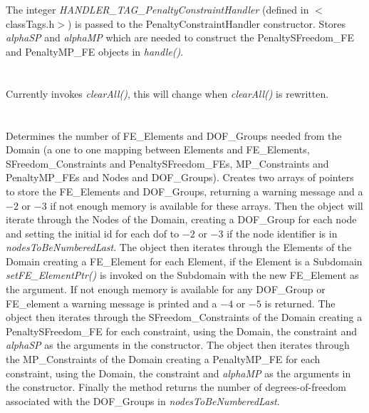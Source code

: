  \\
\\ 
The integer {\em HANDLER\_TAG\_PenaltyConstraintHandler} (defined in
$<$classTags.h$>$) is passed to the PenaltyConstraintHandler
constructor. Stores {\em alphaSP} and {\em alphaMP} which are needed
to construct the PenaltySFreedom\_FE and PenaltyMP\_FE objects in {\em
handle()}. \\

 \\
\\ 
Currently invokes {\em clearAll()}, this will change when {\em
clearAll()} is rewritten. \\

\\
 \\
Determines the number of FE\_Elements and DOF\_Groups needed from the
Domain (a one to one mapping between Elements and FE\_Elements,
SFreedom\_Constraints and PenaltySFreedom\_FEs, MP\_Constraints and PenaltyMP\_FEs and
Nodes and DOF\_Groups). Creates two arrays of pointers to store the
FE\_Elements and DOF\_Groups, returning a warning message and a $-2$
or $-3$ if not enough memory is available for these arrays. Then the
object will iterate through the Nodes of the Domain, creating a
DOF\_Group for each node and setting the initial id for each dof to
$-2$ or $-3$ if the node identifier is in {\em
nodesToBeNumberedLast}. The object then iterates through the Elements
of the Domain creating a FE\_Element for each Element, if the Element
is a Subdomain {\em setFE\_ElementPtr()} is invoked on the Subdomain
with the new FE\_Element as the argument. If not enough memory is
available for any DOF\_Group or FE\_element a warning message is
printed and a $-4$ or $-5$ is returned. 
The object then iterates through the SFreedom\_Constraints
of the Domain creating a PenaltySFreedom\_FE for each constraint, using the
Domain, the constraint and {\em alphaSP} as the arguments in the
constructor.
The object then iterates through the MP\_Constraints
of the Domain creating a PenaltyMP\_FE for each constraint, using the
Domain, the constraint and {\em alphaMP} as the arguments in the constructor.
Finally the method returns the
number of degrees-of-freedom associated with the DOF\_Groups in {\em
nodesToBeNumberedLast}. \\

